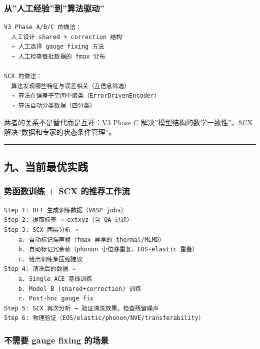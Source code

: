 \documentclass[
  12pt,
]{ctexart}
\begin{document}
\subsubsection{从''人工经验''到''算法驱动''}\label{ux4eceux4ebaux5de5ux7ecfux9a8cux5230ux7b97ux6cd5ux9a71ux52a8}

\begin{verbatim}
V3 Phase A/B/C 的做法：
  人工设计 shared + correction 结构
  → 人工选择 gauge fixing 方法
  → 人工检查每批数据的 fmax 分布
  
SCX 的做法：
  算法发现哪些特征与误差相关（互信息筛选）
  → 算法在误差子空间中聚类（ErrorDrivenEncoder）
  → 算法自动分类数据（四分类）
\end{verbatim}

两者的关系不是替代而是互补：V3 Phase C 解决''模型结构的数学一致性''，SCX
解决''数据和专家的状态条件管理''。

\begin{center}\rule{0.5\linewidth}{0.5pt}\end{center}

\subsection{九、当前最优实践}\label{ux4e5dux5f53ux524dux6700ux4f18ux5b9eux8df5}

\subsubsection{势函数训练 + SCX
的推荐工作流}\label{ux52bfux51fdux6570ux8badux7ec3-scx-ux7684ux63a8ux8350ux5de5ux4f5cux6d41}

\begin{verbatim}
Step 1: DFT 生成训练数据（VASP jobs）
Step 2: 提取标签 → extxyz（含 QA 过滤）
Step 3: SCX 两层分析 →
    a. 自动标记噪声帧（fmax 异常的 thermal/MLMD）
    b. 自动标记冗余帧（phonon 小位移重复、EOS-elastic 重叠）
    c. 给出训练集压缩建议
Step 4: 清洗后的数据 →
    a. Single ACE 基线训练
    b. Model B (shared+correction) 训练
    c. Post-hoc gauge fix
Step 5: SCX 再次分析 → 验证清洗效果，检查残留噪声
Step 6: 物理验证（EOS/elastic/phonon/NVE/transferability）
\end{verbatim}

\subsubsection{不需要 gauge fixing
的场景}\label{ux4e0dux9700ux8981-gauge-fixing-ux7684ux573aux666f}
\end{document}
